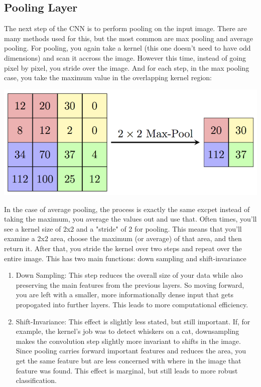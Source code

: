 \documentclass{article}
\begin{document}
    \subsection{Pooling Layer}
        The next step of the CNN is to perform pooling on the input image. There are many methods used for this, but the most common are max pooling and average pooling. For pooling, you again take a kernel (this one doesn't need to have odd dimensions) and scan it accross the image. However this time, instead of going pixel by pixel, you stride over the image. And for each step, in the max pooling case, you take the maximum value in the overlapping kernel region:
        \begin{center}
            \includegraphics{images/maxpool.png}
        \end{center}
        In the case of average pooling, the process is exactly the same excpet instead of taking the maximum, you average the values out and use that. Often times, you'll see a kernel size of 2x2 and a "stride" of 2 for pooling. This means that you'll examine a 2x2 area, choose the maximum (or average) of that area, and then return it. After that, you stride the kernel over two steps and repeat over the entire image. This has two main functions: down sampling and shift-invariance
        \begin{enumerate}
            \item Down Sampling: This step reduces the overall size of your data while also preserving the main features from the previous layers. So moving forward, you are left with a smaller, more informationally dense input that gets propogated into further layers. This leads to more computational efficiency.
            \item Shift-Invariance: This effect is slightly less stated, but still important. If, for example, the kernel's job was to detect whiskers on a cat, downsampling makes the convolution step slightly more invariant to shifts in the image. Since pooling carries forward important features and reduces the area, you get the same feature but are less concerned with where in the image that feature was found. This effect is marginal, but still leads to more robust classification.
        \end{enumerate}
\end{document}
